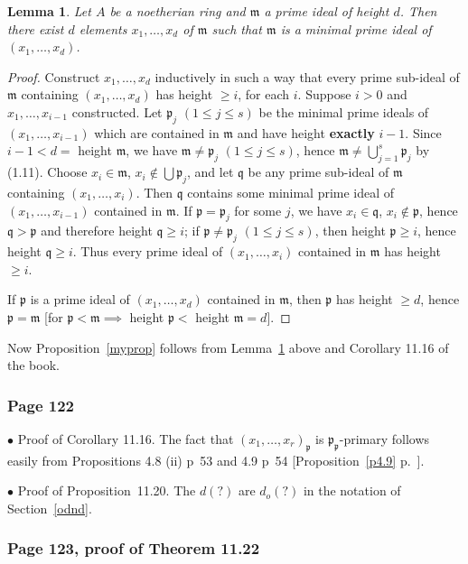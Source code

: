 \documentclass[12pt,letterpaper]{article}%
\newcommand{\mf}{\mathfrak}
\newcommand{\mmm}{\mf m}
\newcommand{\ppp}{\mf p}
\newcommand{\qqq}{\mf q}
\newcommand{\bu}{\bullet}
\newcommand{\nn}{\noindent}
\newtheorem{lem}[thm]{Lemma}
\begin{document}
\begin{lem}\label{p1113}
Let $A$ be a noetherian ring and $\mmm$ a prime ideal of height $d$. Then there exist $d$ elements $x_1,\ldots,x_d$ of $\mmm$ such that $\mmm$ is a minimal prime ideal of $(x_1,\ldots,x_d)$. 
\end{lem}

\begin{proof}
Construct $x_1,\ldots,x_d$ inductively in such a way that every prime sub-ideal of $\mmm$ containing $(x_1,\ldots,x_d)$ has height $\ge i$, for each $i$. Suppose $i>0$ and $x_1,\ldots,x_{i-1}$ constructed. Let $\ppp_j$ $(1\le j\le s)$ be the minimal prime ideals of $(x_1,\ldots,x_{i-1})$ which are contained in $\mmm$ and have height \textbf{exactly} $i-1$. Since $i-1<d=$ height $\mmm$, we have $\mmm\ne\ppp_j$ $(1\le j\le s)$, hence $\mmm\ne\bigcup_{j=1}^s\ppp_j$ by (1.11). Choose $x_i\in\mmm$, $x_i\notin\bigcup\ppp_j$, and let $\qqq$ be any prime sub-ideal of $\mmm$ containing $(x_1,\ldots,x_i)$. Then $\qqq$ contains some minimal prime ideal of $(x_1,\ldots,x_{i-1})$ contained in $\mmm$. If $\ppp=\ppp_j$ for some $j$, we have $x_i\in\qqq$, $x_i\notin\ppp$, hence $\qqq>\ppp$ and therefore height $\qqq\ge i$; if $\ppp\ne\ppp_j$ $(1\le j\le s)$, then height $\ppp\ge i$, hence height $\qqq\ge i$. Thus every prime ideal of $(x_1,\ldots,x_i)$ contained in $\mmm$ has height $\ge i$. 

If $\ppp$ is a prime ideal of $(x_1,\ldots,x_d)$ contained in $\mmm$, then $\ppp$ has height $\ge d$, hence $\ppp=\mmm$ [for $\ppp<\mmm\implies$ height $\ppp<$ height $\mmm=d$]. 
\end{proof} 

Now Proposition~\ref{myprop} follows from Lemma~\ref{p1113} above and Corollary 11.16 of the book. 

\subsubsection{Page 122}%

\nn$\bu$ Proof of Corollary 11.16. The fact that $(x_1,\dots,x_r)_\ppp$ is $\ppp_\ppp$-primary follows easily from Propositions 4.8 (ii) p~53 and 4.9 p~54 [Proposition~\ref{p4.9} p.~\pageref{p4.9}].

\nn$\bu$ Proof of Proposition~11.20. The $d(?)$ are $d_o(?)$ in the notation of Section~\ref{odnd}.

\subsubsection{Page 123, proof of Theorem 11.22}%
\end{document}
